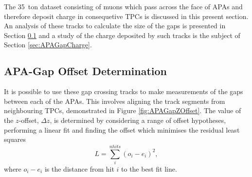 The 35~ton dataset consisting of muons which pass across the face of APAs and therefore deposit charge in consequetive TPCs is discussed in this present section.  An analysis of these tracks to calculate the size of the gaps is presented in Section \ref{sec:APAGapOffsets} and a study of the charge deposited by such tracks is the subject of Section \ref{sec:APAGapCharge}.

\subsection{APA-Gap Offset Determination}\label{sec:APAGapOffsets}

It is possible to use these gap crossing tracks to make measurements of the gaps between each of the APAs.  This involves aligning the track segments from neighbouring TPCs, demonstrated in Figure \ref{fig:APAGapZOffset}.  The value of the $z$-offset, $\Delta z$, is determined by considering a range of offset hypotheses, performing a linear fit and finding the offset which minimises the residual least squares
\begin{equation}
  L = \sum_i^{nhits} (o_i - e_i)^2,
\end{equation}
where $o_i-e_i$ is the distance from hit $i$ to the best fit line.

